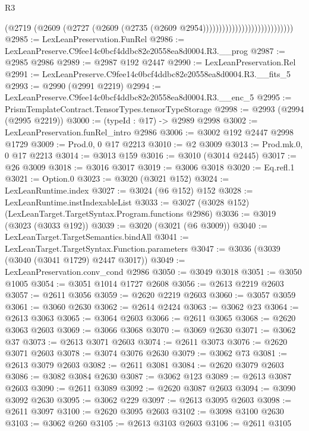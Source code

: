 \begin{lexlean}{R3}
\begin{coremodule}
                                                (@2719
                                                  (@2609
                                                    (@2727
                                                      (@2609
                                                        (@2735
                                                          (@2609 @2954))))))))))))))))))))))))))))
@2985 := LexLeanPreservation.FunRel
@2986 := LexLeanPreserve.C9fee14c0bcf4ddbc82e20558ea8d0004.R3.__prog
@2987 := @2985 @2986
@2989 := @2987 @192 @2447
@2990 := LexLeanPreservation.Rel
@2991 := LexLeanPreserve.C9fee14c0bcf4ddbc82e20558ea8d0004.R3.__fits_5
@2993 := @2990 (@2991 @2219)
@2994 := LexLeanPreserve.C9fee14c0bcf4ddbc82e20558ea8d0004.R3.__enc_5
@2995 := PrismTemplateContract.TensorTypes.tensorTypeStorage
@2998 := @2993 (@2994 (@2995 @2219))
@3000 := (typeId : @17) -> @2989 @2998
@3002 := LexLeanPreservation.funRel_intro @2986
@3006 := @3002 @192 @2447 @2998 @1729
@3009 := Prod.{0, 0} @17 @2213
@3010 := @2 @3009
@3013 := Prod.mk.{0, 0} @17 @2213
@3014 := @3013 @159
@3016 := @3010 (@3014 @2445)
@3017 := @26 @3009
@3018 := @3016 @3017
@3019 := @3006 @3018
@3020 := Eq.refl.{1}
@3021 := Option.{0}
@3023 := @3020 (@3021 @152)
@3024 := LexLeanRuntime.index
@3027 := @3024 (@6 @152) @152
@3028 := LexLeanRuntime.instIndexableList
@3033 := @3027 (@3028 @152) (LexLeanTarget.TargetSyntax.Program.functions @2986)
@3036 := @3019 (@3023 (@3033 @192))
@3039 := @3020 (@3021 (@6 @3009))
@3040 := LexLeanTarget.TargetSemantics.bindAll
@3041 := LexLeanTarget.TargetSyntax.Function.parameters
@3047 := @3036 (@3039 (@3040 (@3041 @1729) @2447 @3017))
@3049 := LexLeanPreservation.conv_cond @2986
@3050 := @3049 @3018
@3051 := @3050 @1005
@3054 := @3051 @1014 @1727 @2608
@3056 := @2613 @2219 @2603
@3057 := @2611 @3056
@3059 := @2620 @2219 @2603
@3060 := @3057 @3059
@3061 := @3060 @2630
@3062 := @2614 @2424
@3063 := @3062 @23
@3064 := @2613 @3063
@3065 := @3064 @2603
@3066 := @2611 @3065
@3068 := @2620 @3063 @2603
@3069 := @3066 @3068
@3070 := @3069 @2630
@3071 := @3062 @37
@3073 := @2613 @3071 @2603
@3074 := @2611 @3073
@3076 := @2620 @3071 @2603
@3078 := @3074 @3076 @2630
@3079 := @3062 @73
@3081 := @2613 @3079 @2603
@3082 := @2611 @3081
@3084 := @2620 @3079 @2603
@3086 := @3082 @3084 @2630
@3087 := @3062 @123
@3089 := @2613 @3087 @2603
@3090 := @2611 @3089
@3092 := @2620 @3087 @2603
@3094 := @3090 @3092 @2630
@3095 := @3062 @229
@3097 := @2613 @3095 @2603
@3098 := @2611 @3097
@3100 := @2620 @3095 @2603
@3102 := @3098 @3100 @2630
@3103 := @3062 @260
@3105 := @2613 @3103 @2603
@3106 := @2611 @3105

\end{coremodule}
\end{lexlean}
